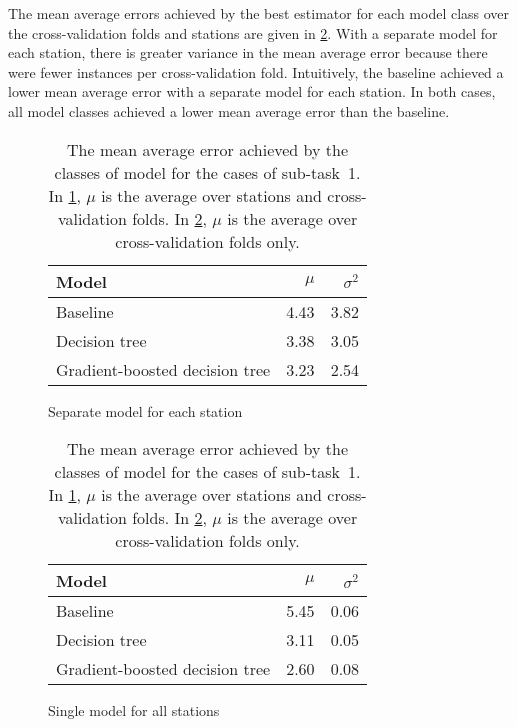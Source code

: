 \documentclass[11pt]{extarticle}
\begin{document}
The mean average errors achieved by the best estimator for each model class over the
cross-validation folds and stations are given in \cref{tab:chart-subtask-1}.
With a separate model for each station, there is greater variance in the mean average
error because there were fewer instances per cross-validation fold.
Intuitively, the baseline achieved a lower mean average error with a separate model for
each station.
In both cases, all model classes achieved a lower mean average error than the baseline.

\begin{table}
  \centering
  \begin{subfigure}{0.49\textwidth}
    \centering
    \begin{tabular}{lrr}
      \toprule
      Model                          & $\mu$ & $\sigma^2$
      \\
      \midrule
      Baseline                       & 4.43  & 3.82
      \\
      Decision tree                  & 3.38  & 3.05
      \\
      Gradient-boosted decision tree & 3.23  & 2.54
      \\
      \bottomrule
    \end{tabular}
    \caption{Separate model for each station}
    \label{tab:chart-subtask-1-1}
  \end{subfigure}
  \begin{subfigure}{0.49\textwidth}
    \centering
    \begin{tabular}{lrr}
      \toprule
      Model                          & $\mu$ & $\sigma^2$
      \\
      \midrule
      Baseline                       & 5.45  & 0.06
      \\
      Decision tree                  & 3.11  & 0.05
      \\
      Gradient-boosted decision tree & 2.60  & 0.08
      \\
      \bottomrule
    \end{tabular}
    \caption{Single model for all stations}
    \label{tab:chart-subtask-1-2}
  \end{subfigure}
  \caption{The mean average error achieved by the classes of model for the cases of sub-task~1.
    In \cref{tab:chart-subtask-1-1}, $\mu$ is the average over stations and
    cross-validation folds.
    In \cref{tab:chart-subtask-1-2}, $\mu$ is the average over cross-validation folds only.
  }
  \label{tab:chart-subtask-1}
\end{table}
\end{document}
